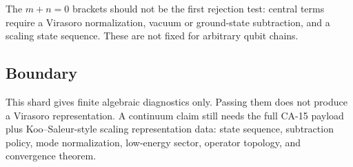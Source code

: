 The \(m+n=0\) brackets should not be the first rejection test: central terms
require a Virasoro normalization, vacuum or ground-state subtraction, and a
scaling state sequence.  These are not fixed for arbitrary qubit chains.

\subsection{Boundary}

This shard gives finite algebraic diagnostics only.  Passing them does not
produce a Virasoro representation.  A continuum claim still needs the full
CA-15 payload plus Koo--Saleur-style scaling representation data: state
sequence, subtraction policy, mode normalization, low-energy sector, operator
topology, and convergence theorem.

